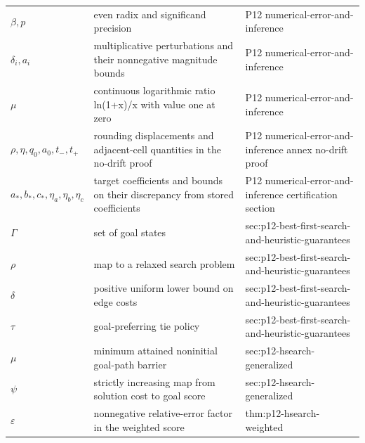 \begin{longtable}{@{}p{}p{}p{}@{}}
\(\beta,\allowbreak p\) & even radix and significand precision & P12 numerical-\allowbreak{}error-\allowbreak{}and-\allowbreak{}inference \\
\(\delta_i,\allowbreak a_i\) & multiplicative perturbations and their nonnegative magnitude bounds & P12 numerical-\allowbreak{}error-\allowbreak{}and-\allowbreak{}inference \\
\(\mu\) & continuous logarithmic ratio ln(1+x)/x with value one at zero & P12 numerical-\allowbreak{}error-\allowbreak{}and-\allowbreak{}inference \\
\(\rho,\allowbreak \eta,\allowbreak q_0,\allowbreak a_0,\allowbreak t_-,\allowbreak t_+\) & rounding displacements and adjacent-cell quantities in the no-drift proof & P12 numerical-\allowbreak{}error-\allowbreak{}and-\allowbreak{}inference annex no-\allowbreak{}drift proof \\
\(a_*,\allowbreak b_*,\allowbreak c_*,\allowbreak \eta_a,\allowbreak \eta_b,\allowbreak \eta_c\) & target coefficients and bounds on their discrepancy from stored coefficients & P12 numerical-\allowbreak{}error-\allowbreak{}and-\allowbreak{}inference certification section \\
\(\Gamma\) & set of goal states & sec:\allowbreak{}p12-\allowbreak{}best-\allowbreak{}first-\allowbreak{}search-\allowbreak{}and-\allowbreak{}heuristic-\allowbreak{}guarantees \\
\(\rho\) & map to a relaxed search problem & sec:\allowbreak{}p12-\allowbreak{}best-\allowbreak{}first-\allowbreak{}search-\allowbreak{}and-\allowbreak{}heuristic-\allowbreak{}guarantees \\
\(\delta\) & positive uniform lower bound on edge costs & sec:\allowbreak{}p12-\allowbreak{}best-\allowbreak{}first-\allowbreak{}search-\allowbreak{}and-\allowbreak{}heuristic-\allowbreak{}guarantees \\
\(\tau\) & goal-preferring tie policy & sec:\allowbreak{}p12-\allowbreak{}best-\allowbreak{}first-\allowbreak{}search-\allowbreak{}and-\allowbreak{}heuristic-\allowbreak{}guarantees \\
\(\mu\) & minimum attained noninitial goal-path barrier & sec:\allowbreak{}p12-\allowbreak{}hsearch-\allowbreak{}generalized \\
\(\psi\) & strictly increasing map from solution cost to goal score & sec:\allowbreak{}p12-\allowbreak{}hsearch-\allowbreak{}generalized \\
\(\varepsilon\) & nonnegative relative-error factor in the weighted score & thm:\allowbreak{}p12-\allowbreak{}hsearch-\allowbreak{}weighted \\

\end{longtable}
